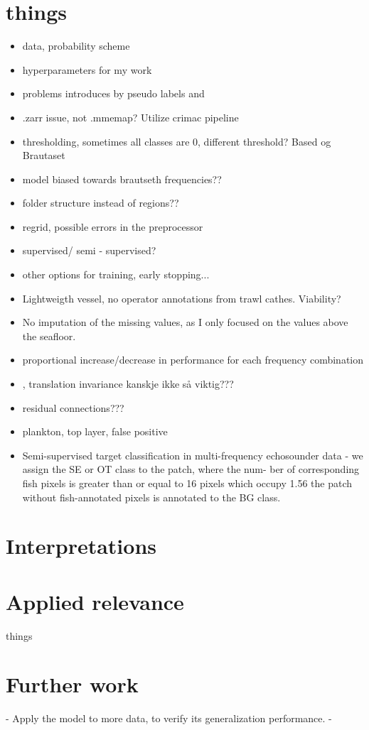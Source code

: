     \section{things}
        \begin{itemize}
            \item data, probability scheme
            \item hyperparameters for my work
            \item problems introduces by pseudo labels and 
            \item .zarr issue, not .mmemap? Utilize crimac pipeline
            \item thresholding, sometimes all classes are 0, different threshold? Based og Brautaset
            \item model biased towards brautseth frequencies??
            \item folder structure instead of regions??
            \item regrid, possible errors in the preprocessor 
            \item supervised/ semi - supervised? 
            \item other options for training, early stopping...
            \item Lightweigth vessel, no operator annotations from trawl cathes. Viability?
            \item No imputation of the missing values, as I only focused on the values above the seafloor.
            \item proportional increase/decrease in performance for each frequency combination \item \citet{mohammed2006acoustic}, translation invariance kanskje ikke så viktig???
            \item residual connections??? \cite{zhang2018road}
            \item plankton, top layer, false positive
            \item Semi-supervised target classification in multi-frequency
echosounder data - we assign the SE or OT class to the patch, where the num-
ber of corresponding fish pixels is greater than or equal to 16 pixels
which occupy 1.56%
the patch without fish-annotated pixels is annotated to the BG class.
        \end{itemize}

    \section{Interpretations}
    \section{Applied relevance}
        things
    
    
    \section{Further work}
        - Apply the model to more data, to verify its generalization performance.
        - 